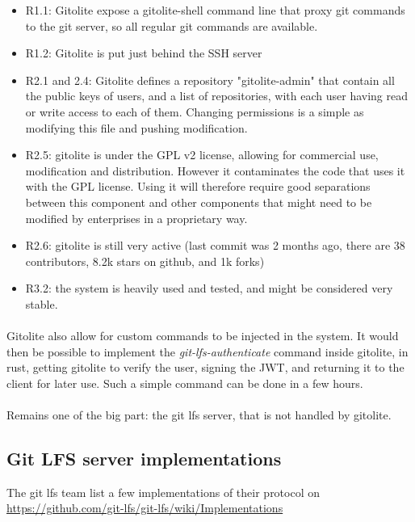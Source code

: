 \begin{itemize}
    \item R1.1: Gitolite expose a gitolite-shell command line that proxy git commands to the git server, so all regular git commands are available.
    \item R1.2: Gitolite is put just behind the SSH server
    \item R2.1 and 2.4: Gitolite defines a repository "gitolite-admin" that contain all the public keys of users, and a list of repositories, with each user having read or write access to each of them. Changing permissions is a simple as modifying this file and pushing modification. 
    \item R2.5: gitolite is under the GPL v2 license, allowing for commercial use, modification and distribution. However it contaminates the code that uses it with the GPL license. Using it will therefore require good separations between this component and other components that might need to be modified by enterprises in a proprietary way.
    \item R2.6: gitolite is still very active (last commit was 2 months ago, there are 38 contributors, 8.2k stars on github, and 1k forks)
    \item R3.2: the system is heavily used and tested, and might be considered very stable.
\end{itemize}

\paragraph{}
Gitolite also allow for custom commands to be injected in the system. It would then be possible to implement the \textit{git-lfs-authenticate} command inside gitolite, in rust, getting gitolite to verify the user, signing the JWT, and returning it to the client for later use. Such a simple command can be done in a few hours. 

\paragraph{}
Remains one of the big part: the git lfs server, that is not handled by gitolite.

\subsection{Git LFS server implementations}
The git lfs team list a few implementations of their protocol on \url{https://github.com/git-lfs/git-lfs/wiki/Implementations}

